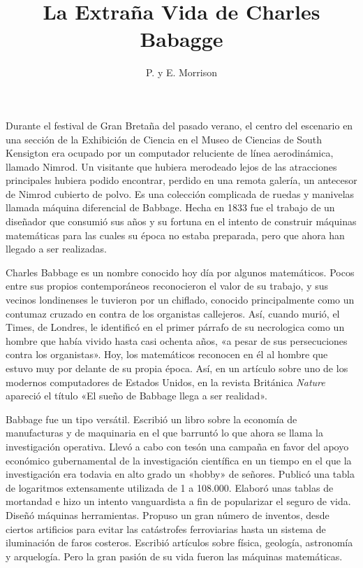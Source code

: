 \documentclass[a4paper, 12pt]{article}
\title{La Extraña Vida de Charles Babagge}
\author{P. y E. Morrison}
\date{}
\begin{document}
\begin{tcolorbox}[colback=blue!5!white,colframe=blue!75!black]

\vspace{-1.8cm}
\textbf \maketitle

\end{tcolorbox}

\bigskip






Durante el festival de Gran Bretaña del pasado verano, el centro del escenario en una sección de la Exhibición de Ciencia en el Museo de Ciencias de South Kensigton era ocupado por un computador reluciente de línea aerodinámica, llamado Nimrod. Un visitante que hubiera merodeado lejos de las atracciones principales hubiera podido encontrar, perdido en una remota galería, un antecesor de Nimrod cubierto de polvo. Es una colección complicada de ruedas y manivelas llamada máquina diferencial de Babbage. Hecha en 1833 fue el trabajo de un diseñador que consumió sus años y su fortuna en el intento de construir máquinas matemáticas para las cuales su época no estaba preparada, pero que ahora han llegado a ser realizadas.

Charles Babbage es un nombre conocido hoy día por algunos  matemáticos. Pocos entre sus propios contemporáneos reconocieron el valor de su trabajo, y sus vecinos londinenses le tuvieron por un chiflado, conocido principalmente como un contumaz cruzado en contra de los organistas callejeros. Así, cuando murió, el Times, de Londres, le identificó en el primer párrafo de su necrologica como un hombre que había vivido hasta casi ochenta años, «a pesar de sus persecuciones contra los organistas». Hoy, los matemáticos reconocen en él al hombre que estuvo muy por delante de su propia época. Así, en un artículo sobre uno de los modernos computadores de Estados Unidos, en la revista Británica {\it Nature} apareció el título «El  sueño de Babbage llega a ser realidad».

Babbage fue un tipo versátil. Escribió un libro sobre la economía de manufacturas y de maquinaria en el que barruntó lo que ahora se llama la investigación operativa. Llevó a cabo con tesón una campaña en favor del apoyo económico gubernamental de la investigación científica en un tiempo en el que la investigación era todavia en alto grado un «hobby» de señores. Publicó una tabla de logaritmos extensamente utilizada de 1 a 108.000. Elaboró unas tablas de mortandad e hizo un intento vanguardista a fin de popularizar el seguro de vida. Diseñó máquinas herramientas. Propuso un gran número de inventos, desde ciertos artificios para evitar las catástrofes ferroviarias hasta un sistema de iluminación de faros costeros. Escribió artículos sobre física, geología, astronomía y arquelogía. Pero la gran pasión de su vida fueron las máquinas matemáticas.
\end{document}
